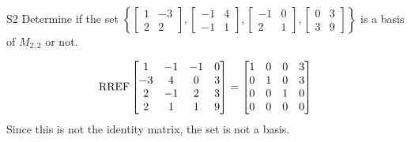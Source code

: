 \documentclass{sbgLAquiz}
\begin{document}
\begin{extract}\newpage\end{extract}
\begin{problem}{S2}
Determine if the set $\left\{ 
\begin{bmatrix} 1 & -3 \\ 2 & 2 \end{bmatrix}, 
\begin{bmatrix} -1 & 4 \\ -1 & 1 \end{bmatrix}, 
\begin{bmatrix} -1 & 0 \\ 2 & 1 \end{bmatrix}, 
\begin{bmatrix} 0 & 3 \\ 3 & 9 \end{bmatrix} 
\right\}$ is a basis of $M_{2,2}$ or not.
\end{problem}

\begin{solution}
$$\operatorname{RREF} \begin{bmatrix} 1 & -1 & -1 & 0 \\ -3 & 4 & 0 & 3 \\ 2 & -1 & 2 & 3 \\ 2 & 1 & 1 & 9 \end{bmatrix}=\begin{bmatrix} 1 &0 & 0 & 3 \\ 0 & 1 & 0 & 3 \\ 0 & 0 & 1 & 0 \\ 0 & 0 & 0 & 0 \end{bmatrix}$$
Since this is not the identity matrix, the set is not a basis.
\end{solution}
\end{document}
